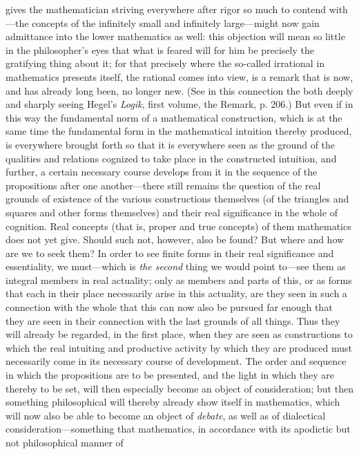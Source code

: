 \documentclass[12pt,a4paper]{book}
\begin{document}
gives the mathematician striving everywhere after rigor so much to contend
with---the concepts of the infinitely small and infinitely large---might now gain
admittance into the lower mathematics as well: this objection will mean so little
in the philosopher's eyes that what is feared will for him be precisely the
gratifying thing about it; for that precisely where the so-called irrational in
mathematics presents itself, the rational comes into view, is a remark that is
now, and has already long been, no longer new. (See in this connection the both
deeply and sharply seeing Hegel's \textit{Logik}, first volume, the Remark, p.
206.) But even if in this way the fundamental norm of a mathematical construction,
which is at the same time the fundamental form in the mathematical intuition
thereby produced, is everywhere brought forth so that it is everywhere seen as the
ground of the qualities and relations cognized to take place in the constructed
intuition, and further, a certain necessary course develops from it in the
sequence of the propositions after one another---there still remains the question
of the real grounds of existence of the various constructions themselves (of the
triangles and squares and other forms themselves) and their real significance in
the whole of cognition. Real concepts (that is, proper and true concepts) of them
mathematics does not yet give. Should such not, however, also be found? But where
and how are we to seek them? In order to see finite forms in their real
significance and essentiality, we must---which is \emph{the second} thing we would
point to---see them as integral members in real actuality; only as members and
parts of this, or as forms that each in their place necessarily arise in this
actuality, are they seen in such a connection with the whole that this can now
also be pursued far enough that they are seen in their connection with the last
grounds of all things. Thus they will already be regarded, in the first place,
when they are seen as constructions to which the real intuiting and productive
activity by which they are produced must necessarily come in its necessary course
of development. The order and sequence in which the propositions are to be
presented, and the light in which they are thereby to be set, will then especially
become an object of consideration; but then something philosophical will thereby
already show itself in mathematics, which will now also be able to become an
object of \emph{debate}, as well as of dialectical consideration---something that
mathematics, in accordance with its apodictic but not philosophical manner of
\end{document}
